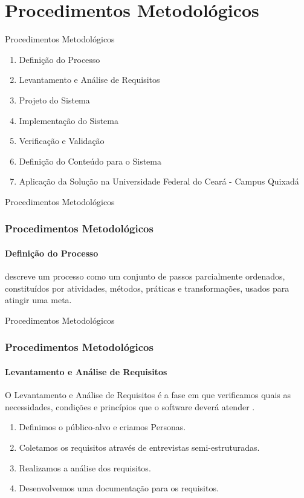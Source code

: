 \documentclass[aspectratio=169]{beamer}
\begin{document}
\section{Procedimentos Metodológicos}

\begin{frame}{Procedimentos Metodológicos}
	\begin{enumerate}
    	\item Definição do Processo
        \item Levantamento e Análise de Requisitos
        \item Projeto do Sistema
        \item Implementação do Sistema
        \item Verificação e Validação
        \item Definição do Conteúdo para o Sistema
        \item Aplicação da Solução na Universidade Federal do Ceará - Campus Quixadá
    \end{enumerate}
\end{frame}


\begin{frame}{Procedimentos Metodológicos}
\frametitle{Procedimentos Metodológicos}
\framesubtitle{Definição do Processo}

 descreve um processo como um conjunto de passos parcialmente ordenados, constituídos por atividades, métodos, práticas e transformações, usados para atingir uma meta.

\end{frame}


\begin{frame}{Procedimentos Metodológicos}
\frametitle{Procedimentos Metodológicos}
\framesubtitle{Levantamento e Análise de Requisitos}

O Levantamento e Análise de Requisitos é a fase em que verificamos quais as necessidades, condições e princípios que o software deverá atender \cite{matuda2013mapas}.
\pause
\begin{enumerate}
	\item Definimos o público-alvo e criamos Personas.
    \pause
	\item Coletamos os requisitos através de entrevistas semi-estruturadas.
    \pause
    \item Realizamos a análise dos requisitos.
    \pause
    \item Desenvolvemos uma documentação para os requisitos.
\end{enumerate}

\end{frame}
\end{document}
